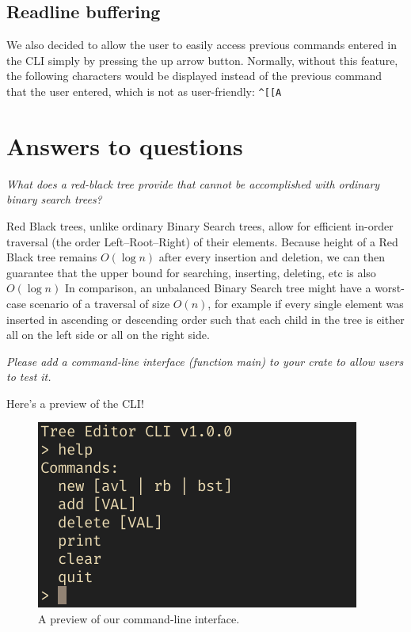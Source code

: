 \documentclass[letterpaper]{article}
\begin{document}
\subsection{Readline buffering}
We also decided to allow the user to easily access previous commands entered in
the CLI simply by pressing the up arrow button. Normally, without this feature,
the following characters would be displayed instead of the previous command that
the user entered, which is not as user-friendly:
\verb|^[[A|


\section{Answers to questions}

\textit{What does a red-black tree provide that cannot be accomplished with
ordinary binary search trees?}

Red Black trees, unlike ordinary Binary Search trees, allow for efficient
in-order traversal (the order Left–Root–Right) of their elements.
Because  height of a Red Black tree remains \(O(\log n)\) after every
insertion and deletion, we can then guarantee that the
upper bound for searching, inserting, deleting, etc is also \(O(\log n)\)
In comparison, an unbalanced Binary Search tree might have a worst-case scenario
of a traversal of size \(O(n)\), for example if every single element was
inserted in ascending or descending order such that each child in the tree is
either all on the left side or all on the right side.

\textit{Please add a command-line interface (function main) to your crate to
allow users to test it.}

Here's a preview of the CLI!
\begin{figure}[H]
      \centering
      \includegraphics[width=.8\textwidth]{cli.png}
      \caption{A preview of our command-line interface.}
\end{figure}
\end{document}
